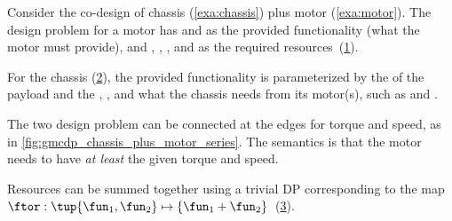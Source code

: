 \begin{example}
	\label{exa:chassis_plus_motor}
	Consider the co-design of chassis (\cref{exa:chassis}) plus motor (\cref{exa:motor}).
	The design problem for a motor has  and  as the provided functionality (what the motor must provide), and , , , and  as the required resources~(\cref{fig:motor}).

	\begin{figure}[h!]
		\centering
		\caption{}
		\label{fig:motor}
	\end{figure}

	For the chassis (\cref{fig:gmcdp_chassis}), the provided functionality is parameterized by the  of the payload and the , , and what the chassis needs from its motor(s), such as  and .

	\begin{figure}[h!]
		\centering
		\caption{}
		\label{fig:gmcdp_chassis}
	\end{figure}

	The two design problem can be connected at the edges for torque and speed, as in \cref{fig:gmcdp_chassis_plus_motor_series}.
	The semantics is that the motor needs to have \emph{at least} the given torque and speed.


	\begin{figure*}[h!]
		\centering
		\caption{}
		\label{fig:gmcdp_chassis_plus_motor_series}
	\end{figure*}

	Resources can be summed together using a trivial DP corresponding to the map $\ftor:\tup{\fun_{1},\fun_{2}} \mapsto\{\fun_{1}+\fun_{2}\}$~(\cref{fig:total_cost}).

	\begin{figure}[h!]
		\centering
		\caption{}
		\label{fig:total_cost}
	\end{figure}



\end{example}
